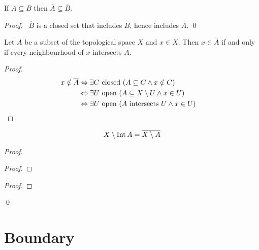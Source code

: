 \begin{lm}
  If $A \subseteq B$ then $\overline{A} \subseteq \overline{B}$.
\end{lm}

\begin{proof}
  \pf\ $\overline{B}$ is a closed set that includes $B$, hence includes $A$.
  \qed
\end{proof}

\begin{thm}
  \label{thm:topology:closure:neighbourhoods}
  Let $A$ be a subset of the topological space $X$ and $x \in X$. Then $x \in
  \overline{A}$ if and only if every neighbourhood of $x$ intersects $A$.
\end{thm}

\begin{proof}
  \pf
  \begin{align*}
    x \notin \overline{A} & \Leftrightarrow \exists C \text{ closed } (A
    \subseteq C \wedge x \notin C) \\
    & \Leftrightarrow \exists U \text{ open } (A \subseteq X \setminus U
    \wedge x
    \in U) \\
    & \Leftrightarrow \exists U \text{ open } (A \text{ intersects } U \wedge
    x
    \in U) & \qed
  \end{align*}
\end{proof}

\begin{lm}
  \label{lm:topology:closure_interior:complementary}
  \[ X \setminus \Int A = \overline{X \setminus A} \]
\end{lm}

\begin{proof}
  \pf
  \begin{proof}
  \end{proof}
  \begin{proof}
  \end{proof}
  \qed
\end{proof}

\section{Boundary}

